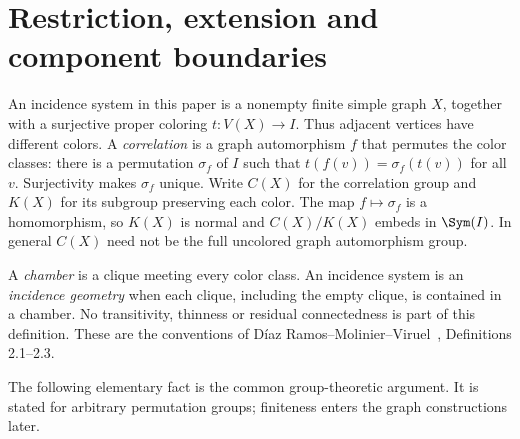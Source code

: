 \section{Restriction, extension and component boundaries}
\label{sec:recognition}
An incidence system in this paper is a nonempty finite simple graph $X$, together
with a surjective proper coloring $t:V(X)\to I$. Thus adjacent vertices have
different colors. A \emph{correlation} is a graph automorphism $f$ that permutes
the color classes: there is a permutation $\sigma_f$ of $I$ such that
$t(f(v))=\sigma_f(t(v))$ for all $v$. Surjectivity makes $\sigma_f$ unique.
Write $C(X)$ for the correlation group and $K(X)$ for its subgroup preserving
each color. The map $f\mapsto\sigma_f$ is a homomorphism, so $K(X)$ is normal
and $C(X)/K(X)$ embeds in $\Sym(I)$. In general $C(X)$ need not be the full
uncolored graph automorphism group.

A \emph{chamber} is a clique meeting every color class. An incidence system is
an \emph{incidence geometry} when each clique, including the empty clique, is
contained in a chamber. No transitivity, thinness or residual connectedness is
part of this definition. These are the conventions of
D\'iaz Ramos--Molinier--Viruel~\cite{DMV}, Definitions 2.1--2.3.

The following elementary fact is the common group-theoretic argument. It is
stated for arbitrary permutation groups; finiteness enters the graph
constructions later.

